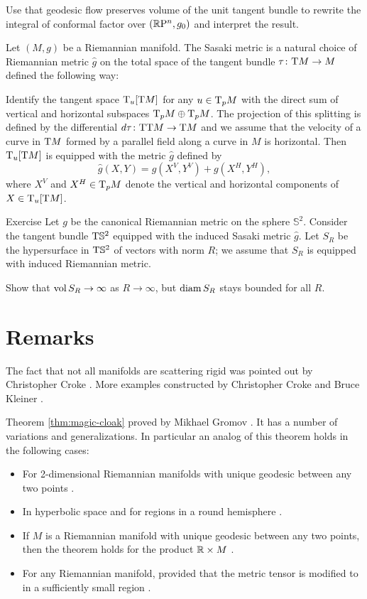  Use that geodesic flow preserves volume of the unit tangent bundle to rewrite the integral of conformal factor over $(\mathbb{R}\mathrm{P}^n,g_0)$ and interpret the result.

\bigskip

Let $(M,g)$ be a Riemannian manifold.
The Sasaki metric is a natural choice of Riemannian metric $\hat g$ on the total space of the tangent bundle $\tau\colon\mathrm{T} M\to M$ defined the following way:

Identify the tangent space 
$\mathrm{T}_u[\mathrm{T} M]$ for any $u\z\in \T_p M$ with the direct sum of vertical and horizontal subspaces $\T_p M\z\oplus \T_p M$.
The projection of this splitting is defined by the differential $d\tau\colon\mathrm{T}\mathrm{T} M\to \mathrm{T} M$
and we assume that the velocity of a curve in $\mathrm{T} M$ formed by a parallel field along a curve in $M$ is horizontal.
Then $\mathrm{T}_u[\mathrm{T} M]$ is equipped with the metric $\hat g$ defined by
\[\hat g(X,Y)=g(X^V,Y^V)+g(X^H,Y^H),\]
where $X^V$ and $X^H\in\mathrm{T}_pM$ denote the vertical and horizontal components of $X\in\mathrm{T}_u[\mathrm{T} M]$.



\begin{thm}{Exercise}
Let $g$ be the canonical Riemannian metric on the sphere $\mathbb{S}^2$.
Consider the tangent bundle $\mathrm{T} \mathbb{S}^2$ 
equipped with the induced Sasaki metric $\hat g$.
Let $S_R$ be the hypersurface in $\mathrm{T} \mathbb{S}^2$ of vectors with norm $R$;
we assume that $S_R$ is equipped with induced Riemannian metric.

Show that $\operatorname{\rm vol}\nolimits S_R\to \infty$ as $R\to\infty$,
but $\operatorname{\rm diam}\nolimits S_R$ stays bounded for all $R$.
\end{thm}



\section{Remarks}

The fact that not all manifolds are scattering rigid was pointed out by Christopher Croke \cite{croke-1991}.
More examples constructed by Christopher Croke and Bruce Kleiner \cite{croke-kleiner-1994}.

Theorem \ref{thm:magic-cloak} proved by Mikhael Gromov \cite{gromov-1983}.
It has a number of variations and generalizations.
In particular an analog of this theorem holds in the following cases:
\begin{itemize}
\item For 2-dimensional Riemannian manifolds with unique geodesic between any two points \cite{pestov-uhlmann}.
\item In hyperbolic space \cite{besson-courtois-gallot-1995, } and for  regions in a round  hemisphere \cite{michel-1981}.
\item If $M$ is a Riemannian manifold with unique geodesic between any two points, then the theorem holds for the product $\mathbb{R}\times M$ \cite{croke-kleiner-1998}.
\item For any Riemannian manifold, provided that the metric tensor is modified to in a sufficiently small region \cite{burago-ivanov-2010}.
\end{itemize}



